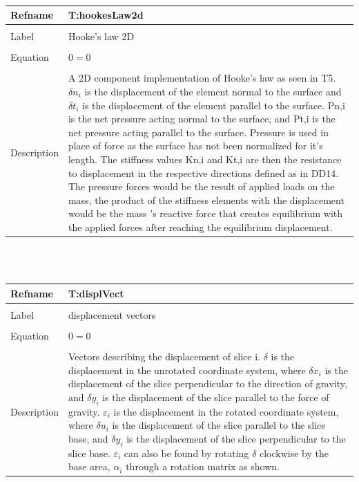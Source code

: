 \documentclass[12pt]{article}
\begin{document}
~\newline
\noindent \begin{minipage}{\textwidth}
\begin{tabular}{p{} p{}}
\toprule \textbf{Refname} & \textbf{T:hookesLaw2d}
\label{T:hookesLaw2d}
\\ \midrule \\
Label & Hooke's law 2D
\\ \midrule \\
Equation & $0=0$
\\ \midrule \\
Description & A 2D component implementation of Hooke's law as seen in T5. $\delta{}n_{i}$ is the displacement of the element normal to the surface and $\delta{}t_{i}$ is the displacement of the element parallel to the surface. Pn,i is the net pressure acting normal to the surface, and Pt,i is the net pressure acting parallel to the surface. Pressure is used in place of force as the surface has not been normalized for it's length. The stiffness values Kn,i and Kt,i are then the resistance to displacement in the respective directions defined as in DD14. The pressure forces would be the result of applied loads on the mass, the product of the stiffness elements with the displacement would be the mass 's reactive force that creates equilibrium with the applied forces after reaching the equilibrium displacement.
\\ \bottomrule \end{tabular}
\end{minipage}\\
~\newline
\noindent \begin{minipage}{\textwidth}
\begin{tabular}{p{} p{}}
\toprule \textbf{Refname} & \textbf{T:displVect}
\label{T:displVect}
\\ \midrule \\
Label & displacement vectors
\\ \midrule \\
Equation & $0=0$
\\ \midrule \\
Description & Vectors describing the displacement of slice i. $\delta{}$ is the displacement in the unrotated coordinate system, where $\delta{}x_{i}$ is the displacement of the slice perpendicular to the direction of gravity, and $\delta{}y_{i}$ is the displacement of the slice parallel to the force of gravity. $\varepsilon{}_{i}$ is the displacement in the rotated coordinate system, where $\delta{}u_{i}$ is the displacement of the slice parallel to the slice base, and $\delta{}y_{i}$ is the displacement of the slice perpendicular to the slice base. $\varepsilon{}_{i}$ can also be found by rotating $\delta{}$ clockwise by the base area, $\alpha{}_{i}$ through a rotation matrix as shown.
\\ \bottomrule \end{tabular}
\end{minipage}\\
\end{document}
